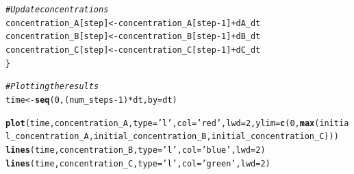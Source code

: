 \documentclass{tufte-handout}\usepackage[]{graphicx}\usepackage[]{xcolor}
\makeatletter
\newcommand{\hlnum}[1]{\textcolor[rgb]{0.686,0.059,0.569}{#1}}%
\newcommand{\hlstr}[1]{\textcolor[rgb]{0.192,0.494,0.8}{#1}}%
\newcommand{\hlcom}[1]{\textcolor[rgb]{0.678,0.584,0.686}{\textit{#1}}}%
\newcommand{\hlopt}[1]{\textcolor[rgb]{0,0,0}{#1}}%
\newcommand{\hlstd}[1]{\textcolor[rgb]{0.345,0.345,0.345}{#1}}%
\newcommand{\hlkwb}[1]{\textcolor[rgb]{0.69,0.353,0.396}{#1}}%
\newcommand{\hlkwc}[1]{\textcolor[rgb]{0.333,0.667,0.333}{#1}}%
\newcommand{\hlkwd}[1]{\textcolor[rgb]{0.737,0.353,0.396}{\textbf{#1}}}%
\newenvironment{kframe}{%
 \def\at@end@of@kframe{}%
 \ifinner\ifhmode%
  \def\at@end@of@kframe{\end{minipage}}%
  \begin{minipage}{\columnwidth}%
 \fi\fi%
 \def\FrameCommand##1{\hskip\@totalleftmargin \hskip-\fboxsep
 \colorbox{shadecolor}{##1}\hskip-\fboxsep
     \hskip-\linewidth \hskip-\@totalleftmargin \hskip\columnwidth}%
 \MakeFramed {\advance\hsize-\width
   \@totalleftmargin\z@ \linewidth\hsize
   \@setminipage}}%
 {\par\unskip\endMakeFramed%
 \at@end@of@kframe}
\newenvironment{knitrout}{}{} %
\makeatother
\begin{document}
\begin{knitrout}
\begin{kframe}
\begin{alltt}
  \hlcom{# Update concentrations}
  \hlstd{concentration_A[step]} \hlkwb{<-} \hlstd{concentration_A[step} \hlopt{-} \hlnum{1}\hlstd{]} \hlopt{+} \hlstd{dA_dt}
  \hlstd{concentration_B[step]} \hlkwb{<-} \hlstd{concentration_B[step} \hlopt{-} \hlnum{1}\hlstd{]} \hlopt{+} \hlstd{dB_dt}
  \hlstd{concentration_C[step]} \hlkwb{<-} \hlstd{concentration_C[step} \hlopt{-} \hlnum{1}\hlstd{]} \hlopt{+} \hlstd{dC_dt}
\hlstd{\}}

\hlcom{# Plotting the results}
\hlstd{time} \hlkwb{<-} \hlkwd{seq}\hlstd{(}\hlnum{0}\hlstd{, (num_steps} \hlopt{-} \hlnum{1}\hlstd{)} \hlopt{*} \hlstd{dt,} \hlkwc{by} \hlstd{= dt)}

\hlkwd{plot}\hlstd{(time, concentration_A,} \hlkwc{type} \hlstd{=} \hlstr{'l'}\hlstd{,} \hlkwc{col} \hlstd{=} \hlstr{'red'}\hlstd{,} \hlkwc{lwd} \hlstd{=} \hlnum{2}\hlstd{,} \hlkwc{ylim} \hlstd{=} \hlkwd{c}\hlstd{(}\hlnum{0}\hlstd{,} \hlkwd{max}\hlstd{(initial_concentration_A, initial_concentration_B, initial_concentration_C)))}
\hlkwd{lines}\hlstd{(time, concentration_B,} \hlkwc{type} \hlstd{=} \hlstr{'l'}\hlstd{,} \hlkwc{col} \hlstd{=} \hlstr{'blue'}\hlstd{,} \hlkwc{lwd} \hlstd{=} \hlnum{2}\hlstd{)}
\hlkwd{lines}\hlstd{(time, concentration_C,} \hlkwc{type} \hlstd{=} \hlstr{'l'}\hlstd{,} \hlkwc{col} \hlstd{=} \hlstr{'green'}\hlstd{,} \hlkwc{lwd} \hlstd{=} \hlnum{2}\hlstd{)}


\end{alltt}
\end{kframe}
\end{knitrout}
\end{document}
